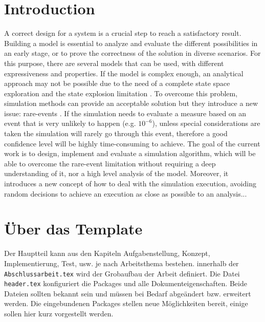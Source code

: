 \chapter{Introduction} 
\label{ch:Introduction}
A correct design for a system is a crucial step to reach a satisfactory result. Building a model is essential to analyze and evaluate the different possibilities in an early stage, or to prove the correctness of the solution in diverse scenarios. For this purpose, there are several models \cite{zeigler:modsim} that can be used, with different expressiveness and properties. If the model is complex enough, an analytical approach may not be possible due to the need of a complete state space exploration and the state explosion limitation \cite{Valmari1998}. To overcome this problem, simulation methods \cite{simulationmethodsreliability} can provide an acceptable solution but they introduce a new issue: rare-events \cite{goerg:rareevent,Heegaard97speedupsimulation}. If the simulation needs to evaluate a measure \cite{haas:spn} based on an event that is very unlikely to happen (e.g. $10^{-6}$), unless special considerations are taken the simulation will rarely go through this event, therefore a good confidence level will be highly time-consuming to achieve. The goal of the current work is to design, implement and evaluate a simulation algorithm, which will be able to overcome the rare-event limitation without requiring a deep understanding of it, nor a high level analysis of the model. Moreover, it introduces a new concept of how to deal with the simulation execution, avoiding random decisions to achieve an execution as close as possible to an analysis...


\chapter{Über das Template}
\label{sec:haupt}

Der Hauptteil kann aus den Kapiteln Aufgabenstellung, Konzept, Implementierung, Test, usw. je nach Arbeitsthema bestehen. innerhalb der \texttt{Abschlussarbeit.tex} wird der Grobaufbau der Arbeit definiert. Die Datei \texttt{header.tex} konfiguriert die Packages und alle Dokumenteigenschaften. Beide Dateien sollten bekannt sein und müssen bei Bedarf abgeändert bzw. erweitert werden. Die eingebundenen Packages stellen neue Möglichkeiten bereit, einige sollen hier kurz vorgestellt werden.

